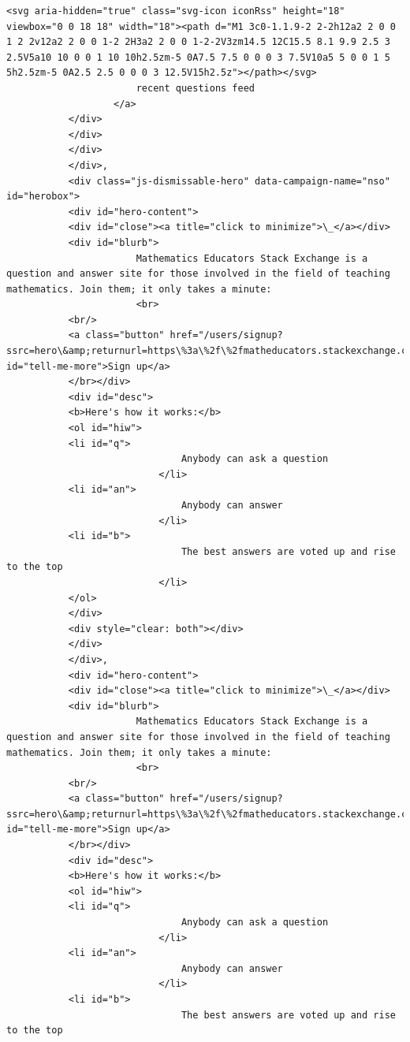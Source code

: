 \documentclass[11pt]{article}
\begin{document}
\begin{Verbatim}[commandchars=\\\{\}]
           <svg aria-hidden="true" class="svg-icon iconRss" height="18" viewbox="0 0 18 18" width="18"><path d="M1 3c0-1.1.9-2 2-2h12a2 2 0 0 1 2 2v12a2 2 0 0 1-2 2H3a2 2 0 0 1-2-2V3zm14.5 12C15.5 8.1 9.9 2.5 3 2.5V5a10 10 0 0 1 10 10h2.5zm-5 0A7.5 7.5 0 0 0 3 7.5V10a5 5 0 0 1 5 5h2.5zm-5 0A2.5 2.5 0 0 0 3 12.5V15h2.5z"></path></svg>
                       recent questions feed
                   </a>
           </div>
           </div>
           </div>
           </div>,
           <div class="js-dismissable-hero" data-campaign-name="nso" id="herobox">
           <div id="hero-content">
           <div id="close"><a title="click to minimize">\_</a></div>
           <div id="blurb">
                       Mathematics Educators Stack Exchange is a question and answer site for those involved in the field of teaching mathematics. Join them; it only takes a minute:
                       <br>
           <br/>
           <a class="button" href="/users/signup?ssrc=hero\&amp;returnurl=https\%3a\%2f\%2fmatheducators.stackexchange.com\%2f" id="tell-me-more">Sign up</a>
           </br></div>
           <div id="desc">
           <b>Here's how it works:</b>
           <ol id="hiw">
           <li id="q">
                               Anybody can ask a question
                           </li>
           <li id="an">
                               Anybody can answer
                           </li>
           <li id="b">
                               The best answers are voted up and rise to the top
                           </li>
           </ol>
           </div>
           <div style="clear: both"></div>
           </div>
           </div>,
           <div id="hero-content">
           <div id="close"><a title="click to minimize">\_</a></div>
           <div id="blurb">
                       Mathematics Educators Stack Exchange is a question and answer site for those involved in the field of teaching mathematics. Join them; it only takes a minute:
                       <br>
           <br/>
           <a class="button" href="/users/signup?ssrc=hero\&amp;returnurl=https\%3a\%2f\%2fmatheducators.stackexchange.com\%2f" id="tell-me-more">Sign up</a>
           </br></div>
           <div id="desc">
           <b>Here's how it works:</b>
           <ol id="hiw">
           <li id="q">
                               Anybody can ask a question
                           </li>
           <li id="an">
                               Anybody can answer
                           </li>
           <li id="b">
                               The best answers are voted up and rise to the top

\end{Verbatim}
\end{document}
